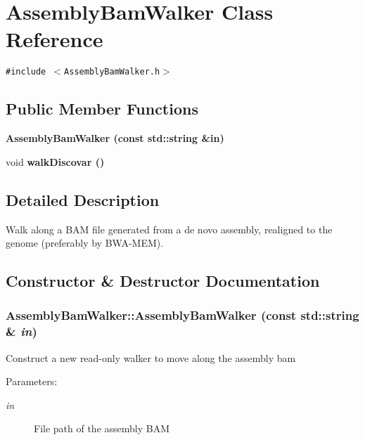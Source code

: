 \section{Assembly\-Bam\-Walker Class Reference}
\label{classAssemblyBamWalker}
{\tt \#include $<$Assembly\-Bam\-Walker.h$>$}

\subsection*{Public Member Functions}
\begin{CompactItemize}
\item 
\bf{Assembly\-Bam\-Walker} (const std::string \&in)
\item 
void \bf{walk\-Discovar} ()
\end{CompactItemize}


\subsection{Detailed Description}
Walk along a BAM file generated from a de novo assembly, realigned to the genome (preferably by BWA-MEM). 



\subsection{Constructor \& Destructor Documentation}
\subsubsection{\setlength{\rightskip}{0pt plus 5cm}Assembly\-Bam\-Walker::Assembly\-Bam\-Walker (const std::string \& {\em in})\hspace{0.3cm}{\tt  [inline]}}\label{classAssemblyBamWalker_875ee00bbca6f5adbbba388d4efb8669}


Construct a new read-only walker to move along the assembly bam \begin{Desc}
\item[Parameters:]
\begin{description}
\item[{\em in}]File path of the assembly BAM \end{description}
\end{Desc}



